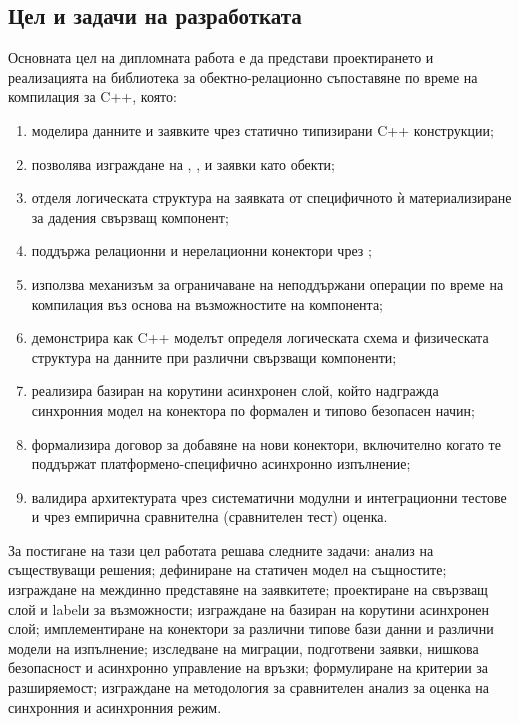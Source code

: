 \subsection{Цел и задачи на разработката}

Основната цел на дипломната работа е да представи проектирането и реализацията на библиотека за обектно-релационно съпоставяне по време на компилация за C++, която:

\begin{enumerate}[label=\arabic*.]
    \item моделира данните и заявките чрез статично типизирани C++ конструкции;
    \item позволява изграждане на , ,  и  заявки като  обекти;
    \item отделя логическата структура на заявката от специфичното ѝ материализиране за дадения свързващ компонент;
    \item поддържа релационни и нерелационни конектори чрез ;
    \item използва механизъм за ограничаване на неподдържани операции по време на компилация въз основа на възможностите на компонента;
    \item демонстрира как C++ моделът определя логическата схема и физическата структура на данните при различни свързващи компоненти;
    \item реализира базиран на корутини асинхронен слой, който надгражда синхронния модел на конектора по формален и типово безопасен начин;
    \item формализира договор за добавяне на нови конектори, включително когато те поддържат платформено-специфично асинхронно изпълнение;
    \item валидира архитектурата чрез систематични модулни и интеграционни тестове и чрез емпирична сравнителна (сравнителен тест) оценка.
\end{enumerate}

За постигане на тази цел работата решава следните задачи: анализ на съществуващи решения; дефиниране на статичен модел на същностите; изграждане на междинно представяне на заявкитете; проектиране на свързващ слой и labelи за възможности; изграждане на базиран на корутини асинхронен слой; имплементиране на конектори за различни типове бази данни и различни модели на изпълнение; изследване на миграции, подготвени заявки, нишкова безопасност и асинхронно управление на връзки; формулиране на критерии за разширяемост; изграждане на методология за сравнителен анализ за оценка на синхронния и асинхронния режим.

